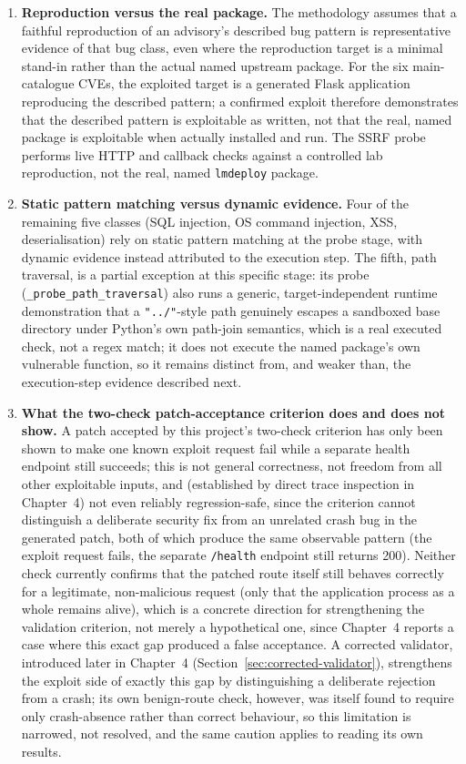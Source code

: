 \documentclass[12pt,a4paper]{report}
\begin{document}
\begin{enumerate}
\item \textbf{Reproduction versus the real package.} The methodology assumes that a faithful reproduction of an advisory's described bug pattern is representative evidence of that bug class, even where the reproduction target is a minimal stand-in rather than the actual named upstream package. For the six main-catalogue CVEs, the exploited target is a generated Flask application reproducing the described pattern; a confirmed exploit therefore demonstrates that the described pattern is exploitable as written, not that the real, named package is exploitable when actually installed and run. The SSRF probe performs live HTTP and callback checks against a controlled lab reproduction, not the real, named \texttt{lmdeploy} package.

\item \textbf{Static pattern matching versus dynamic evidence.} Four of the remaining five classes (SQL injection, OS command injection, XSS, deserialisation) rely on static pattern matching at the probe stage, with dynamic evidence instead attributed to the execution step. The fifth, path traversal, is a partial exception at this specific stage: its probe (\texttt{\_probe\_path\_traversal}) also runs a generic, target-independent runtime demonstration that a \texttt{"../"}-style path genuinely escapes a sandboxed base directory under Python's own path-join semantics, which is a real executed check, not a regex match; it does not execute the named package's own vulnerable function, so it remains distinct from, and weaker than, the execution-step evidence described next.

\item \textbf{What the two-check patch-acceptance criterion does and does not show.} A patch accepted by this project's two-check criterion has only been shown to make one known exploit request fail while a separate health endpoint still succeeds; this is not general correctness, not freedom from all other exploitable inputs, and (established by direct trace inspection in Chapter~4) not even reliably regression-safe, since the criterion cannot distinguish a deliberate security fix from an unrelated crash bug in the generated patch, both of which produce the same observable pattern (the exploit request fails, the separate \texttt{/health} endpoint still returns 200). Neither check currently confirms that the patched route itself still behaves correctly for a legitimate, non-malicious request (only that the application process as a whole remains alive), which is a concrete direction for strengthening the validation criterion, not merely a hypothetical one, since Chapter~4 reports a case where this exact gap produced a false acceptance. A corrected validator, introduced later in Chapter~4 (Section~\ref{sec:corrected-validator}), strengthens the exploit side of exactly this gap by distinguishing a deliberate rejection from a crash; its own benign-route check, however, was itself found to require only crash-absence rather than correct behaviour, so this limitation is narrowed, not resolved, and the same caution applies to reading its own results.


\end{enumerate}
\end{document}
